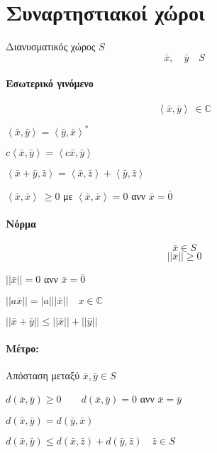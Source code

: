     \section{Συναρτηστιακοί χώροι}
    Διανυσματικός χώρος \( S \)
    \[
    \bar x,\quad \bar y\quad S
    \]

    \paragraph{Εσωτερικό γινόμενο}
    \[ \left\langle\bar x,\bar y\right\rangle\ \in \mathbb C  \]
    \begin{enumpar}
        \item \( \left\langle\bar x,\bar y\right\rangle
        = \left\langle\bar y,\bar x\right\rangle^* \)
        \item \( c\left\langle\bar x,\bar y\right\rangle
        =\left\langle c\bar x,\bar y\right\rangle \)
        \item \( \left\langle\bar x+\bar y,\bar z\right\rangle
        = \left\langle\bar x,\bar z\right\rangle+\left\langle\bar y,\bar z\right\rangle \)
        \item \( \left\langle\bar x,\bar x\right\rangle \ \geq 0 \) με
        \( \left\langle\bar x,\bar x\right\rangle = 0 \) ανν \( \bar x = \bar 0 \)
    \end{enumpar}

    \paragraph{Νόρμα}
    \[
    \bar x \in S
    \]\[
    ||\bar x|| \geq0
    \]
    \begin{enumpar}
        \item \( ||\bar x|| = 0 \) ανν \( \bar x = \bar 0 \)
        \item \( ||a\bar x|| = |a|||\bar x|| \quad x \in\mathbb C \)
        \item \( ||\bar x+\bar y|| \leq ||\bar x|| + ||\bar y|| \)
    \end{enumpar}
    \paragraph{Μέτρο:} Απόσταση μεταξύ \( \bar x,\bar y \in S \)
    \begin{enumpar}
        \item \( d(\bar x,\bar y)\geq 0 \qquad d(\bar x,\bar y)=0 \)
        ανν \( \bar x = \bar y \)
        \item \( d(\bar x,\bar y) = d(\bar y,\bar x) \)
        \item \( d(\bar x,\bar y) \leq d(\bar x,\bar z) + d(\bar y,\bar z)
        \quad \bar z\in S
         \)

    \end{enumpar}


